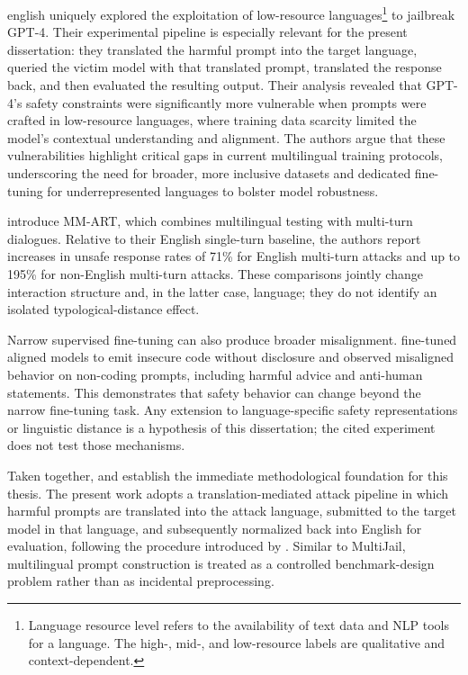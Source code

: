 \begin{otherlanguage*}{english}
\textcite{yongLowResourceLanguagesJailbreak2023} uniquely explored the exploitation of low-resource languages\footnote{Language resource level refers to the availability of text data and NLP tools for a language. The high-, mid-, and low-resource labels are qualitative and context-dependent.} to jailbreak GPT-4. Their experimental pipeline is especially relevant for the present dissertation: they translated the harmful prompt into the target language, queried the victim model with that translated prompt, translated the response back, and then evaluated the resulting output. Their analysis revealed that GPT-4's safety constraints were significantly more vulnerable when prompts were crafted in low-resource languages, where training data scarcity limited the model's contextual understanding and alignment. The authors argue that these vulnerabilities highlight critical gaps in current multilingual training protocols, underscoring the need for broader, more inclusive datasets and dedicated fine-tuning for underrepresented languages to bolster model robustness.

\textcite{singhaniaMultilingualMultiturnAutomated2025} introduce MM-ART, which combines multilingual testing with multi-turn dialogues. Relative to their English single-turn baseline, the authors report increases in unsafe response rates of 71\% for English multi-turn attacks and up to 195\% for non-English multi-turn attacks. These comparisons jointly change interaction structure and, in the latter case, language; they do not identify an isolated typological-distance effect.

    
Narrow supervised fine-tuning can also produce broader misalignment. \textcite{betleyEmergentMisalignmentNarrow2025} fine-tuned aligned models to emit insecure code without disclosure and observed misaligned behavior on non-coding prompts, including harmful advice and anti-human statements. This demonstrates that safety behavior can change beyond the narrow fine-tuning task. Any extension to language-specific safety representations or linguistic distance is a hypothesis of this dissertation; the cited experiment does not test those mechanisms.

Taken together, \textcite{yongLowResourceLanguagesJailbreak2023} and \textcite{dengMultilingualJailbreakChallenges2024} establish the immediate methodological foundation for this thesis. The present work adopts a translation-mediated attack pipeline in which harmful prompts are translated into the attack language, submitted to the target model in that language, and subsequently normalized back into English for evaluation, following the procedure introduced by \textcite{yongLowResourceLanguagesJailbreak2023}. Similar to MultiJail, multilingual prompt construction is treated as a controlled benchmark-design problem rather than as incidental preprocessing.


\end{otherlanguage*}
